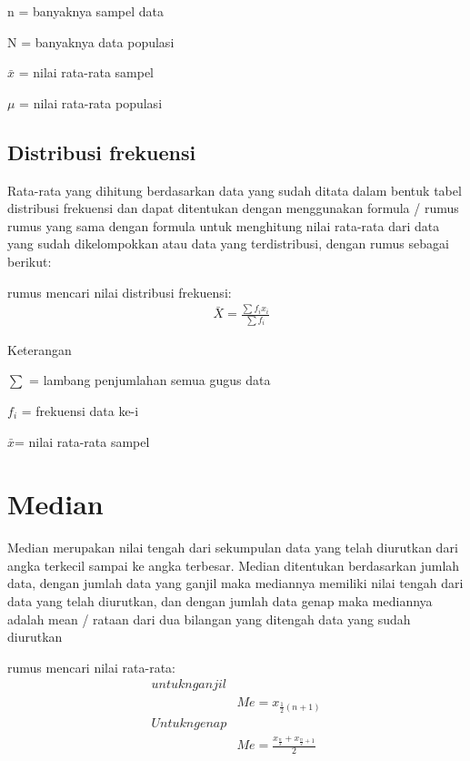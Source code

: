\documentclass[11pt,fleqn]{book} %
\begin{document}
{n = banyaknya sampel data 

N = banyaknya data populasi 

$\bar x$ = nilai rata-rata sampel

$\mu$ = nilai rata-rata populasi

\subsection{Distribusi frekuensi}
Rata-rata yang dihitung berdasarkan data yang sudah ditata dalam bentuk tabel distribusi frekuensi dan dapat ditentukan dengan menggunakan formula / rumus rumus yang sama dengan formula untuk menghitung nilai rata-rata dari data yang sudah dikelompokkan atau data yang terdistribusi, dengan rumus sebagai berikut:

\begin{theorem}[Mean]
rumus mencari nilai distribusi frekuensi:
\begin{align}
& \bar{X} = \frac{\sum f_{i}x_{i}}{\sum f_{i}} 
\end{align}
\end{theorem}

Keterangan
 
$ \sum $ = lambang penjumlahan semua gugus data

$ f_{i} $ = frekuensi data ke-i

$ \bar x $= nilai rata-rata sampel


\section{Median}

Median merupakan nilai tengah dari sekumpulan data yang telah diurutkan dari angka terkecil sampai ke angka terbesar. Median ditentukan berdasarkan jumlah data, dengan jumlah data yang ganjil maka mediannya memiliki nilai tengah dari data yang telah diurutkan, dan dengan jumlah data genap maka mediannya adalah mean / rataan dari dua bilangan yang ditengah data yang sudah diurutkan

\begin{theorem}[Mean]
rumus mencari nilai rata-rata:
\begin{align}
untuk n ganjil\\
& Me =x_{\frac{1}{2}(n+1)} \\
Untuk n genap\\
& Me =\frac{x_{\frac{n}{2}}+x_{\frac{n}{2}+1}}{2}
\end{align}
\end{theorem}

}
\end{document}
